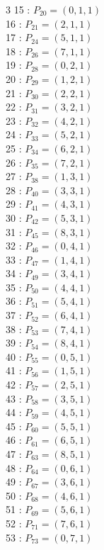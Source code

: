 \documentclass{article}
\begin{document}
{\begin{multicols}{3}
15 : $P_{20}=( 0, 1, 1 )$\\
16 : $P_{21}=( 2, 1, 1 )$\\
17 : $P_{24}=( 5, 1, 1 )$\\
18 : $P_{26}=( 7, 1, 1 )$\\
19 : $P_{28}=( 0, 2, 1 )$\\
20 : $P_{29}=( 1, 2, 1 )$\\
21 : $P_{30}=( 2, 2, 1 )$\\
22 : $P_{31}=( 3, 2, 1 )$\\
23 : $P_{32}=( 4, 2, 1 )$\\
24 : $P_{33}=( 5, 2, 1 )$\\
25 : $P_{34}=( 6, 2, 1 )$\\
26 : $P_{35}=( 7, 2, 1 )$\\
27 : $P_{38}=( 1, 3, 1 )$\\
28 : $P_{40}=( 3, 3, 1 )$\\
29 : $P_{41}=( 4, 3, 1 )$\\
30 : $P_{42}=( 5, 3, 1 )$\\
31 : $P_{45}=( 8, 3, 1 )$\\
32 : $P_{46}=( 0, 4, 1 )$\\
33 : $P_{47}=( 1, 4, 1 )$\\
34 : $P_{49}=( 3, 4, 1 )$\\
35 : $P_{50}=( 4, 4, 1 )$\\
36 : $P_{51}=( 5, 4, 1 )$\\
37 : $P_{52}=( 6, 4, 1 )$\\
38 : $P_{53}=( 7, 4, 1 )$\\
39 : $P_{54}=( 8, 4, 1 )$\\
40 : $P_{55}=( 0, 5, 1 )$\\
41 : $P_{56}=( 1, 5, 1 )$\\
42 : $P_{57}=( 2, 5, 1 )$\\
43 : $P_{58}=( 3, 5, 1 )$\\
44 : $P_{59}=( 4, 5, 1 )$\\
45 : $P_{60}=( 5, 5, 1 )$\\
46 : $P_{61}=( 6, 5, 1 )$\\
47 : $P_{63}=( 8, 5, 1 )$\\
48 : $P_{64}=( 0, 6, 1 )$\\
49 : $P_{67}=( 3, 6, 1 )$\\
50 : $P_{68}=( 4, 6, 1 )$\\
51 : $P_{69}=( 5, 6, 1 )$\\
52 : $P_{71}=( 7, 6, 1 )$\\
53 : $P_{73}=( 0, 7, 1 )$\\

\end{multicols}}
\end{document}
